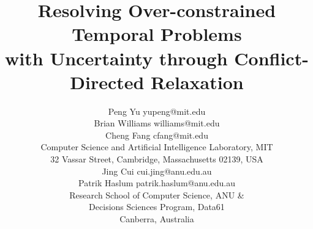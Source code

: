 \documentclass[jair,twoside,11pt,theapa]{article}
\begin{document}
	
\title{Resolving Over-constrained Temporal Problems\\ with Uncertainty through
	Conflict-Directed Relaxation}

\author{\name Peng Yu \email yupeng@mit.edu\\
	\name Brian Williams \email williams@mit.edu\\
	\name Cheng Fang \email cfang@mit.edu\\
	\addr Computer Science and Artificial Intelligence Laboratory, MIT\\
	32 Vassar Street, Cambridge, Massachusetts 02139, USA\\
	\name Jing Cui \email cui.jing@anu.edu.au\\
	\name Patrik Haslum \email patrik.haslum@anu.edu.au\\	
	\addr Research School of Computer Science, ANU \&\\
	Decisions Sciences Program, Data61\\
	Canberra, Australia}

\newtheorem{mydef}{Definition}
\newtheorem{problem}{Problem}

\maketitle
	
\end{document}

